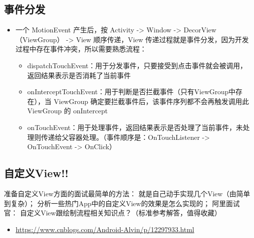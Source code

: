 \documentclass[9pt, b5paper]{article}
\begin{document}
\subsection{事件分发}
\label{sec-6-2}
\begin{itemize}
\item 一个 MotionEvent 产生后，按 Activity -> Window -> DecorView（ViewGroup） -> View 顺序传递，View 传递过程就是事件分发，因为开发过程中存在事件冲突，所以需要熟悉流程：
\begin{itemize}
\item dispatchTouchEvent：用于分发事件，只要接受到点击事件就会被调用，返回结果表示是否消耗了当前事件
\item onInterceptTouchEvent：用于判断是否拦截事件（只有ViewGroup中存在），当 ViewGroup 确定要拦截事件后，该事件序列都不会再触发调用此 ViewGroup 的 onIntercept
\item onTouchEvent：用于处理事件，返回结果表示是否处理了当前事件，未处理则传递给父容器处理。（事件顺序是：OnTouchListener -> OnTouchEvent -> OnClick）
\end{itemize}
\end{itemize}
\subsection{自定义View!!}
\label{sec-6-3}
准备自定义View方面的面试最简单的方法：
就是自己动手实现几个View（由简单到复杂）；
分析一些热门App中的自定义View的效果是怎么实现的；
阿里面试官： 自定义View跟绘制流程相关知识点？（标准参考解答，值得收藏）
\begin{itemize}
\item \url{https://www.cnblogs.com/Android-Alvin/p/12297933.html}
\end{itemize}
\end{document}
